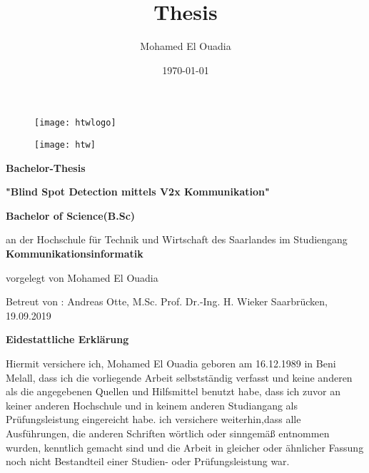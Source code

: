 \documentclass[15pt]{scrartcl}
\begin{document}
\thispagestyle{empty}
\quad  \addtocounter{page}{-1}

\title{Thesis}
\author{Mohamed El Ouadia}
\date{\today}

\begin{figure}[h]
\begin{minipage}{0.5\textwidth }
	\texttt{[image: htwlogo]}	
\end{minipage}\hspace{5cm}
\begin{minipage}{0.5\textwidth}
	\texttt{[image: htw]}
\end{minipage}
\end{figure}

\begin{center}
\begin{large}
\textbf{Bachelor-Thesis}\break 
\end{large}

\textbf{"Blind Spot Detection mittels V2x Kommunikation"}\break

\textbf {Bachelor of Science(B.Sc)} \break \break 

an der Hochschule für Technik und Wirtschaft des Saarlandes\break 
im Studiengang\break \textbf{ Kommunikationsinformatik}\break 

vorgelegt von \break 
Mohamed El Ouadia\break 

Betreut von :\break 
Andreas Otte, M.Sc.\break 
Prof. Dr.-Ing. H. Wieker\break\break \break 
Saarbrücken, 19.09.2019
\end{center}

\newpage
\thispagestyle{empty}
\quad  \addtocounter{page}{-1}

\newpage
\thispagestyle{empty}
\quad  \addtocounter{page}{-1}
\begin{large}
\textbf{Eidestattliche Erklärung}
\end{large}

Hiermit versichere ich, 
Mohamed El Ouadia
geboren am 16.12.1989
in Beni Melall, dass ich die vorliegende Arbeit selbstständig verfasst und keine anderen als die angegebenen Quellen und Hilfsmittel benutzt habe, dass ich zuvor an keiner anderen Hochschule und in keinem anderen Studiangang als Prüfungsleistung eingereicht habe.
ich versichere weiterhin,dass alle Ausführungen, die anderen Schriften wörtlich oder sinngemäß entnommen wurden, kenntlich gemacht sind und die Arbeit in gleicher oder ähnlicher Fassung noch nicht Bestandteil einer Studien- oder Prüfungsleistung war.\newline
\end{document}
